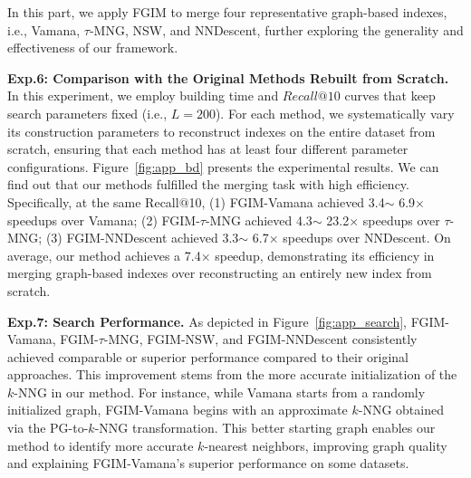 \documentclass[acmsmall]{acmart}
\theoremstyle{remark}
\theoremstyle{definition}
\begin{document}
In this part, we apply FGIM to merge four representative graph-based indexes, i.e., Vamana, $\tau$-MNG, NSW, and NNDescent, further exploring the generality and effectiveness of our framework.

\noindent\textbf{Exp.6: Comparison with the Original Methods Rebuilt from Scratch.} In this experiment, we employ building time and $Recall@10$ curves that keep search parameters fixed (i.e., $L=200$). For each method, we systematically vary its construction parameters to reconstruct indexes on the entire dataset from scratch, ensuring that each method has at least four different parameter configurations. Figure~\ref{fig:app_bd} presents the experimental results. We can find out that our methods fulfilled the merging task with high efficiency. Specifically, at the same Recall$@$10, (1) FGIM-Vamana achieved 3.4$\sim$ 6.9$\times$ speedups over Vamana; (2) FGIM-$\tau$-MNG achieved 4.3$\sim$ 23.2$\times$ speedups over $\tau$-MNG; (3) FGIM-NNDescent achieved 3.3$\sim$ 6.7$\times$ speedups over NNDescent. On average, our method achieves a 7.4$\times$ speedup, demonstrating its efficiency in merging graph-based indexes over reconstructing an entirely new index from scratch.


\noindent\textbf{Exp.7: Search Performance.} As depicted in Figure~\ref{fig:app_search}, FGIM-Vamana, FGIM-$\tau$-MNG, FGIM-NSW, and FGIM-NNDescent consistently achieved comparable or superior performance compared to their original approaches. This improvement stems from the more accurate initialization of the $k$-NNG in our method. For instance, while Vamana starts from a randomly initialized graph, FGIM-Vamana begins with an approximate $k$-NNG obtained via the PG-to-$k$-NNG transformation. This better starting graph enables our method to identify more accurate $k$-nearest neighbors, improving graph quality and explaining FGIM-Vamana’s superior performance on some datasets.
\end{document}
